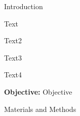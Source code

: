 \documentclass[final]{beamer}
\newlength{\onecolwid}
\begin{document}
\begin{frame}[t]
\begin{columns}[t]
\begin{column}{\onecolwid}
\begin{block}{Introduction}


Text

\vspace{0.5cm}

Text2

\vspace{0.5cm}

Text3

\vspace{0.5cm}

Text4

\vspace{0.5cm}

\textbf{Objective:} Objective


\end{block}

\vspace{2cm}


%
%
%
%
%



\begin{block}{Materials and Methods}


\end{block}
\end{column}
\end{columns}
\end{frame}
\end{document}
